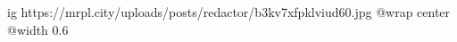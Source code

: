  
 
 
 
 

\ifcmt
  ig https://mrpl.city/uploads/posts/redactor/b3kv7xfpklviud60.jpg
  @wrap center
  @width 0.6
\fi
